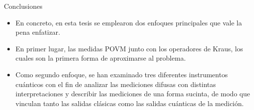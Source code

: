 \documentclass[svgnames,12pt,aspectratio=149]{beamer}
\begin{document}
\begin{frame}{Conclusiones}
    \begin{itemize}
      \item En concreto, en esta tesis se emplearon dos enfoques
      principales que vale la pena enfatizar.
      
      
      \item En primer lugar, las medidas POVM junto con los operadores de Kraus, los cuales son la primera forma de aproximarse al problema. 
      
      \item Como segundo enfoque, se han examinado tres diferentes instrumentos cuánticos con el fin de analizar las mediciones difusas con distintas interpretaciones y describir las mediciones de una forma sucinta, de modo que vinculan tanto las salidas clásicas como las salidas cuánticas de la medición.%
    \end{itemize}
\end{frame}
\end{document}
